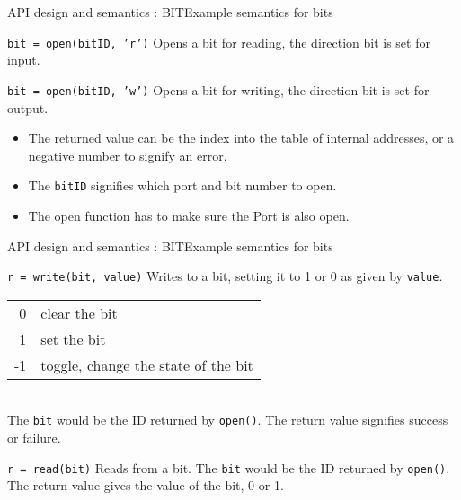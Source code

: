 \documentclass[xcolor=svgnames]{beamer}
\begin{document}
\begin{frame}[fragile]{API design and semantics : BIT}{Example semantics for bits}
\begin{block}{\texttt{bit = open(bitID, 'r')}}
Opens a bit for reading, the direction bit is set for input.
\end{block}
\begin{block}{\texttt{bit = open(bitID, 'w')}}
Opens a bit for writing, the direction bit is set for output.
\end{block}
\begin{itemize}
    \item The returned value can be the index into the table of internal addresses, or a negative number to signify an error.
    \item The \alert{\texttt{bitID}} signifies which port and bit number to open.
    \item The open function has to make sure the Port is also open.
\end{itemize}
\end{frame}

\begin{frame}[fragile]{API design and semantics : BIT}{Example semantics for bits}
    \begin{block}{\texttt{r = write(bit, value)}}
    Writes to a bit, setting it to 1 or 0 as given by \alert{\texttt{value}}.
    \begin{tabular}{rl}
         0  & clear the bit \\
        1  &set the bit\\
         -1 & toggle, change the state of the bit
    \end{tabular}\\
      The \alert{\texttt{bit}} would be the ID returned by \texttt{open()}.  The return value signifies success or failure.
\end{block}
\begin{block}{\texttt{r = read(bit)}}
    Reads from a bit.  The \alert{\texttt{bit}} would be the ID returned by \texttt{open()}.  The return value gives the value of the bit, 0 or 1.
\end{block}

\end{frame}
\end{document}
